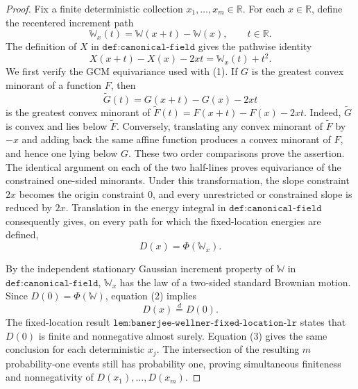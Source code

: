 \documentclass{article}
\begin{document}
\begin{proof}
Fix a finite deterministic collection \(x_1,\ldots,x_m\in\mathbb R\).  For each \(x\in\mathbb R\), define the recentered increment path
\[
 \mathbb W_x(t)=\mathbb W(x+t)-\mathbb W(x),\qquad t\in\mathbb R.
\]
The definition of \(X\) in \(\texttt{def:canonical-field}\) gives the pathwise identity
\[
 X(x+t)-X(x)-2xt=\mathbb W_x(t)+t^2. \tag{1}
\]
We first verify the GCM equivariance used with (1).  If \(G\) is the greatest convex minorant of a function \(F\), then
\[
 \widetilde G(t)=G(x+t)-G(x)-2xt
\]
is the greatest convex minorant of
\(
 \widetilde F(t)=F(x+t)-F(x)-2xt
\).
Indeed, \(\widetilde G\) is convex and lies below \(\widetilde F\).  Conversely, translating any convex minorant of \(\widetilde F\) by \(-x\) and adding back the same affine function produces a convex minorant of \(F\), and hence one lying below \(G\).  These two order comparisons prove the assertion.  The identical argument on each of the two half-lines proves equivariance of the constrained one-sided minorants.  Under this transformation, the slope constraint \(2x\) becomes the origin constraint \(0\), and every unrestricted or constrained slope is reduced by \(2x\).  Translation in the energy integral in \(\texttt{def:canonical-field}\) consequently gives, on every path for which the fixed-location energies are defined,
\[
 D(x)=\Phi(\mathbb W_x). \tag{2}
\]

By the independent stationary Gaussian increment property of \(\mathbb W\) in \(\texttt{def:canonical-field}\), \(\mathbb W_x\) has the law of a two-sided standard Brownian motion.  Since \(D(0)=\Phi(\mathbb W)\), equation (2) implies
\[
 D(x)\stackrel{d}{=}D(0). \tag{3}
\]
The fixed-location result \(\texttt{lem:banerjee-wellner-fixed-location-lr}\) states that \(D(0)\) is finite and nonnegative almost surely.  Equation (3) gives the same conclusion for each deterministic \(x_j\).  The intersection of the resulting \(m\) probability-one events still has probability one, proving simultaneous finiteness and nonnegativity of \(D(x_1),\ldots,D(x_m)\).


\end{proof}
\end{document}

